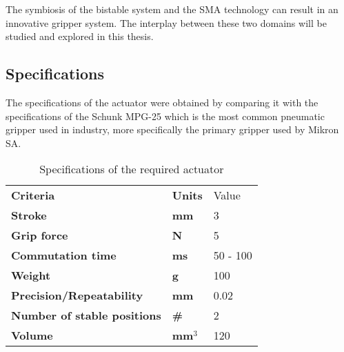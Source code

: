 The symbiosis of the bistable system and the SMA technology can result in an innovative gripper system. The interplay between these two domains will be studied and explored in this thesis.

\subsection{Specifications}\label{subsec:specifications}
The specifications of the actuator were obtained by comparing it with the specifications of the Schunk MPG-25 which is the most common pneumatic gripper used in industry, more specifically the primary gripper used by Mikron SA.
\begin{table}[h]
  \centering
  \footnotesize
  \caption{Specifications of the required actuator}
  \label{tab:specs}
  \begin{tabu} to 0.5
      Criteria & Units & Value\\
      Stroke & mm & 3\\
      Grip force & N & 5\\
      Commutation time & ms & 50 - 100\\
      Weight & g & 100\\
      Precision/Repeatability & mm & 0.02\\
      Number of stable positions & \# & 2\\
      Volume & mm$^3$ & 120 \\
  \end{tabu}
\end{table}

